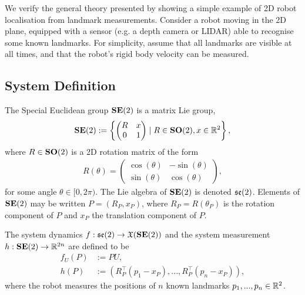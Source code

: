 \documentclass{article}
\begin{document}

We verify the general theory presented by showing a simple example of 2D robot localisation from landmark measurements.
Consider a robot moving in the 2D plane, equipped with a sensor (e.g. a depth camera or LIDAR) able to recognise some known landmarks.
For simplicity, assume that all landmarks are visible at all times, and that the robot's rigid body velocity can be measured.

\subsection{System Definition}

The Special Euclidean group $\mathbf{SE}(2)$ is a matrix Lie group,
\begin{align*}
    \mathbf{SE}(2) := \left\{ \begin{pmatrix} R & x \\ 0 & 1 \end{pmatrix} \mid R \in \mathbf{SO}(2), x \in \mathbb{R}^2  \right\},
\end{align*}
where $R \in \mathbf{SO}(2)$ is a 2D rotation matrix of the form
\begin{align*}
    R(\theta) = \begin{pmatrix} \cos(\theta) & -\sin(\theta) \\ \sin(\theta) & \cos(\theta) \end{pmatrix},
\end{align*}
for some angle $\theta \in [0, 2\pi)$.
The Lie algebra of $\mathbf{SE}(2)$ is denoted $\mathfrak{se}(2)$.
Elements of $\mathbf{SE}(2)$ may be written $P = (R_P, x_P)$, where $R_P = R(\theta_P)$ is the rotation component of $P$ and $x_P$ the translation component of $P$.

The system dynamics $f: \mathfrak{se}(2) \to \mathfrak{X}(\mathbf{SE}(2))$
and the system measurement $h: \mathbf{SE}(2) \to \mathbb{R}^{2n}$ are defined to be
\begin{align*}
    f_U(P) &:= P U, \\
    h(P) &:= (R_P^\top(p_1 - x_P), ..., R_P^\top(p_n - x_P)),
\end{align*}
where the robot measures the positions of $n$ known landmarks $p_1,..., p_n \in \mathbb{R}^2$.
\end{document}
